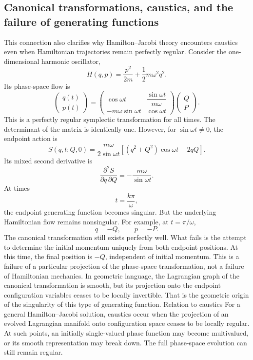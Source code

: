 \subsection{ Canonical transformations, caustics, and the failure of generating functions}
This connection also clarifies why Hamilton–Jacobi theory encounters caustics
even when Hamiltonian trajectories remain perfectly regular.
Consider the one-dimensional harmonic oscillator,
\[
H(q,p)=\frac{p^2}{2m}+\frac12m\omega^2q^2.
\]
Its phase-space flow is
\[
\begin{pmatrix}q(t)\\p(t)\end{pmatrix}
=
\begin{pmatrix}
\cos\omega t & \dfrac{\sin\omega t}{m\omega}\\
-m\omega\sin\omega t & \cos\omega t
\end{pmatrix}
\begin{pmatrix}Q\\P\end{pmatrix}.
\]
This is a perfectly regular symplectic transformation for all times.
The determinant of the matrix is identically one.
However, for \(\sin\omega t\ne0\), the endpoint action is
\[
\boxed{
S(q,t;Q,0)
=
\frac{m\omega}{2\sin\omega t}
\left[
(q^2+Q^2)\cos\omega t-2qQ
\right].
}
\]
Its mixed second derivative is
\[
\frac{\partial^2 S}{\partial q\,\partial Q}
=-\frac{m\omega}{\sin\omega t}.
\]
At times
\[
t=\frac{k\pi}{\omega},
\]
the endpoint generating function becomes singular.
But the underlying Hamiltonian flow remains nonsingular.
For example, at \(t=\pi/\omega\),
\[
q=-Q,\qquad p=-P.
\]
The canonical transformation still exists perfectly well. What fails is the
attempt to determine the initial momentum uniquely from both endpoint
positions. At this time, the final position is \(-Q\), independent of initial
momentum. This is a failure of a particular projection of the phase-space
transformation, not a failure of Hamiltonian mechanics. In geometric language,
the Lagrangian graph of the canonical transformation is smooth, but its
projection onto the endpoint configuration variables ceases to be locally
invertible. That is the geometric origin of the singularity of this type of
generating function. Relation to caustics For a general Hamilton–Jacobi
solution, caustics occur when the projection of an evolved Lagrangian manifold
onto configuration space ceases to be locally regular. At such points, an
initially single-valued phase function may become multivalued, or its smooth
representation may break down. The full phase-space evolution can still remain
regular.

